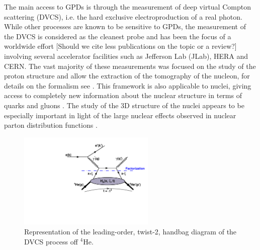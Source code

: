 \documentclass[nofootinbib,twocolumn,showpacs,prl,superscriptaddress,secnumarabic,amssymb,nobibnotes,aps,floatfix,preprint]{revtex4}
\begin{document}
The main access to GPDs is through the measurement of deep virtual Compton 
scattering (DVCS), i.e. the hard exclusive electroproduction of a real photon. 
While other processes are known to be sensitive to GPDs, the measurement of the
DVCS is considered as the cleanest probe and has been the focus of a worldwide effort 
\cite{Stepanyan:2001sm,Airapetian,Chekanov:2003ya,Aktas:2005ty,Chen:2006na,Munoz 
Camacho:2006hx,Girod:2007aa,Mazouz:2007aa,Gavalian:2009,Seder:2015,Pisano:2015,Jo:2015ema} 
[Should we cite less publications on the topic or a review?]
involving several accelerator facilities such as Jefferson Lab (JLab), HERA and  
CERN. The vast majority of these measurements was focused on the study of the 
proton structure and allow the extraction of the tomography of the nucleon,
for details on the formalism see 
\cite{Goeke:2001tz,Diehl:2003ny,Ji:2004gf,Belitsky:2005qn,Boffi:2007yc,Guidal:2013rya}.
This framework is also applicable to nuclei, giving access to completely new 
information about the nuclear structure in terms of quarks and 
gluons \cite{Dupre:2015jha}.
The study of the 3D structure of the nuclei appears to be especially important
in light of the large nuclear effects observed in nuclear parton distribution 
functions \cite{Geesaman:1995yd,Norton:2003cb,Hen:2016kwk}.

\begin{figure}[tb]
\includegraphics[width=6.5cm]{figs/DVCS_diagram.pdf}
\caption{Representation of the leading-order, twist-2, handbag diagram of the 
DVCS process off $^4$He.}
\label{fig:diags}
\end{figure}
\end{document}
